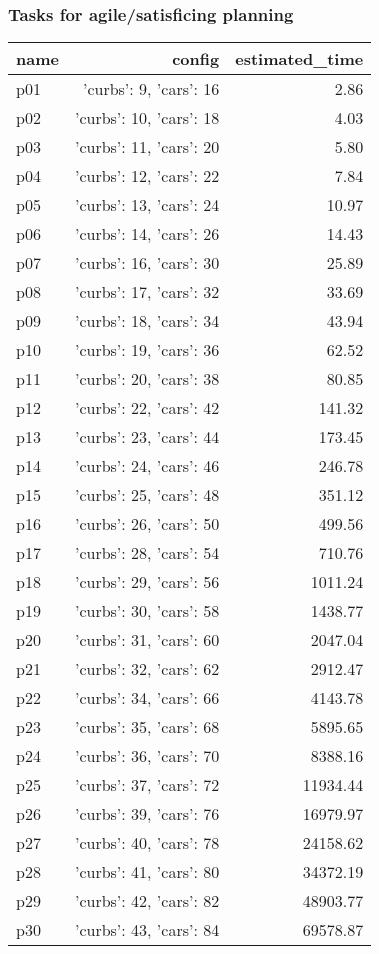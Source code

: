 \documentclass{article}
\begin{document}
                                \subsubsection*{Tasks for agile/satisficing planning}
                                
                            \begin{center}
                            \scriptsize
                            \begin{tabular}{@{}l|r|r@{}}
                            name & config & estimated\_time\\\midrule
                              p01&{'curbs': 9, 'cars': 16}&2.86\\
  p02&{'curbs': 10, 'cars': 18}&4.03\\
  p03&{'curbs': 11, 'cars': 20}&5.80\\
  p04&{'curbs': 12, 'cars': 22}&7.84\\
  p05&{'curbs': 13, 'cars': 24}&10.97\\
  p06&{'curbs': 14, 'cars': 26}&14.43\\
  p07&{'curbs': 16, 'cars': 30}&25.89\\
  p08&{'curbs': 17, 'cars': 32}&33.69\\
  p09&{'curbs': 18, 'cars': 34}&43.94\\
  p10&{'curbs': 19, 'cars': 36}&62.52\\
  p11&{'curbs': 20, 'cars': 38}&80.85\\
  p12&{'curbs': 22, 'cars': 42}&141.32\\
  p13&{'curbs': 23, 'cars': 44}&173.45\\
  p14&{'curbs': 24, 'cars': 46}&246.78\\
  p15&{'curbs': 25, 'cars': 48}&351.12\\
  p16&{'curbs': 26, 'cars': 50}&499.56\\
  p17&{'curbs': 28, 'cars': 54}&710.76\\
  p18&{'curbs': 29, 'cars': 56}&1011.24\\
  p19&{'curbs': 30, 'cars': 58}&1438.77\\
  p20&{'curbs': 31, 'cars': 60}&2047.04\\
  p21&{'curbs': 32, 'cars': 62}&2912.47\\
  p22&{'curbs': 34, 'cars': 66}&4143.78\\
  p23&{'curbs': 35, 'cars': 68}&5895.65\\
  p24&{'curbs': 36, 'cars': 70}&8388.16\\
  p25&{'curbs': 37, 'cars': 72}&11934.44\\
  p26&{'curbs': 39, 'cars': 76}&16979.97\\
  p27&{'curbs': 40, 'cars': 78}&24158.62\\
  p28&{'curbs': 41, 'cars': 80}&34372.19\\
  p29&{'curbs': 42, 'cars': 82}&48903.77\\
  p30&{'curbs': 43, 'cars': 84}&69578.87
                            \end{tabular}
                            \end{center}
                    
\end{document}
